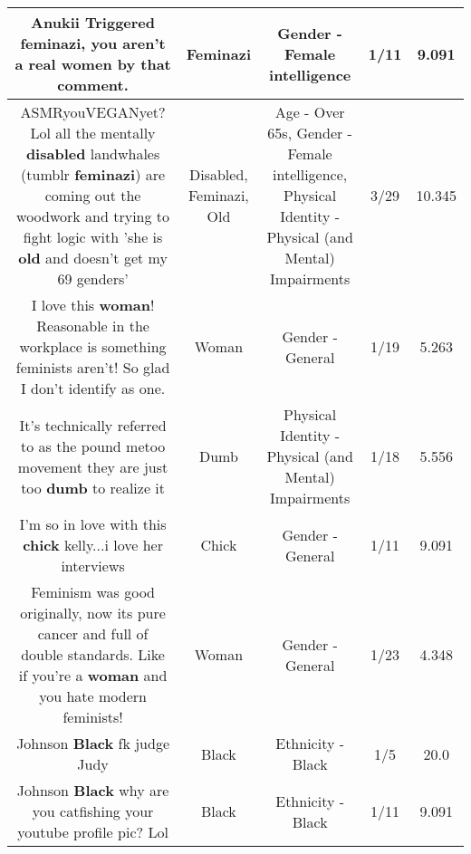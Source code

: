 \documentclass[11pt]{article}
\newlength\mylength
\begin{document}
\begin{center}
\begin{longtable}{|C{.65\mylength}|C{.30\mylength}|C{.12\mylength}|C{.12\mylength}|C{.12\mylength}|}
  \small Anukii Triggered \textbf{feminazi}, you aren't a real women by that comment.\normalsize   & Feminazi & Gender - Female intelligence & 1/11 & 9.091 \\  \hline
  \small ASMRyouVEGANyet? Lol all the mentally \textbf{disabled} landwhales (tumblr \textbf{feminazi}) are coming out the woodwork and trying to fight logic with 'she is \textbf{old} and doesn't get my 69 genders'\normalsize   & Disabled, Feminazi, Old & Age - Over 65s, Gender - Female intelligence, Physical Identity - Physical (and Mental) Impairments & 3/29 & 10.345 \\  \hline
  \small I love this \textbf{woman}! Reasonable in the workplace is something feminists aren't! So glad I don't identify as one.\normalsize   & Woman & Gender - General & 1/19 & 5.263 \\  \hline
  \small It's technically referred to as the  pound metoo movement they are just too \textbf{dumb} to realize it\normalsize   & Dumb & Physical Identity - Physical (and Mental) Impairments & 1/18 & 5.556 \\  \hline
  \small I'm so in love with this \textbf{chick} kelly...i love her interviews\normalsize   & Chick & Gender - General & 1/11 & 9.091 \\  \hline
  \small Feminism was good originally, now its pure cancer and full of double standards. Like if you're a \textbf{woman} and you hate modern feminists!\normalsize   & Woman & Gender - General & 1/23 & 4.348 \\  \hline
  \small Johnson \textbf{Black} fk judge Judy\normalsize   & Black & Ethnicity - Black & 1/5 & 20.0 \\  \hline
  \small Johnson \textbf{Black} why are you catfishing your youtube profile pic? Lol\normalsize   & Black & Ethnicity - Black & 1/11 & 9.091 \\  \hline

\end{longtable}
\end{center}
\end{document}
